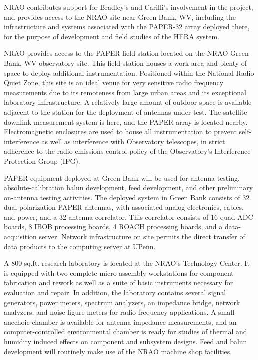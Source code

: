 \documentclass[11pt]{article}
\begin{document}
NRAO contributes support for Bradley's and Carilli's involvement in the
project, and provides access to the NRAO site near Green Bank, WV,
including the infrastructure and systems associated with the PAPER-32
array deployed there, for the purpose of development and field studies
of the HERA system.


NRAO provides access to the PAPER field station located on the NRAO Green Bank, WV observatory
site. This field station houses a work area and plenty of space to deploy additional instrumentation.
Positioned within the National Radio Quiet Zone, this site is an ideal venue
for very sensitive radio frequency measurements due to its remoteness from
large urban areas and its exceptional laboratory infrastructure. A relatively
large amount of outdoor space is available adjacent to the station for the
deployment of antennas under test. The satellite downlink measurement system is
here, and the PAPER array is located nearby. Electromagnetic enclosures are
used to house all instrumentation to prevent self-interference as well as
interference with Observatory telescopes, in strict adherence to the radio
emissions control policy of the Observatory’s Interference Protection Group
(IPG).

PAPER equipment deployed at Green Bank will be used for antenna testing,
absolute-calibration balun development,
feed development, and other preliminary on-antenna testing activities.
The deployed system in Green Bank consists of 32 dual-polarization PAPER antennas,
with associated analog electronics, cables, and power, and a 32-antenna correlator.
This correlator consists of 16 quad-ADC boards, 8 IBOB processing boards,
4 ROACH processing boards, and a data-acquisition server.  Network infrastructure 
on site permits the direct transfer of data products to the computing server 
at UPenn.

A 800 sq.ft. research laboratory is located at the NRAO’s Technology Center.
It is equipped with two complete micro-assembly workstations for component
fabrication and rework as well as a suite of basic instruments necessary for
evaluation and repair. In addition, the laboratory contains several signal
generators, power meters, spectrum analyzers, an impedance bridge, network
analyzers, and noise figure meters for radio frequency applications. A small
anechoic chamber is available for antenna impedance measurements, and an
computer-controlled environmental chamber is ready for studies of thermal and
humidity induced effects on component and subsystem designs. Feed and balun
development will routinely make
use of the NRAO machine shop facilities.
\end{document}
